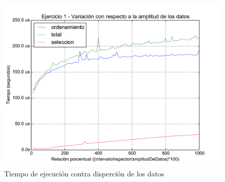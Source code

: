 \documentclass[11pt, a4paper, twoside]{article}
\begin{document}
\clearpage
\begin{figure}[H]
   \begin{center}
   \includegraphics[width=1.4\textwidth,angle=90]{../ej1/graficos/test_3.pdf}
   \caption{Tiempo de ejecución contra disperción de los datos}
   \label{fig:ej1-3}
   \end{center}
\end{figure}







\end{document}

